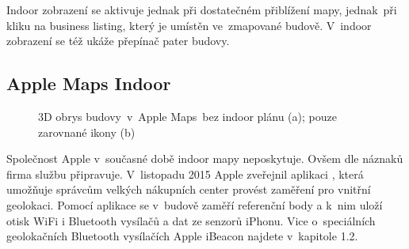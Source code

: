 Indoor zobrazení se aktivuje jednak při dostatečném přiblížení mapy, jednak~při kliku na business listing, který je umístěn ve~zmapované budově. V~indoor zobrazení se též ukáže přepínač pater budovy.

\subsection{Apple Maps Indoor}\label{apple-maps-indoor}


                      \begin{figure}
                    	  \centering
                    \hfill

                    \caption{3D obrys budovy~v~Apple Maps~bez indoor plánu (a); pouze zarovnané ikony (b)}
                    \label{obr3}
                    \end{figure}
                    

Společnost Apple v~současné době indoor mapy neposkytuje. Ovšem dle náznaků firma službu připravuje. V~listopadu 2015 Apple zveřejnil aplikaci \cite{zdroj18}, která umožňuje správcům velkých nákupních center provést zaměření pro vnitřní geolokaci. Pomocí aplikace se v~budově zaměří referenční body a k~nim uloží otisk WiFi i Bluetooth vysílačů a dat ze senzorů iPhonu. Vice o~speciálních geolokačních Bluetooth vysílačích Apple iBeacon najdete v~kapitole 1.2.

